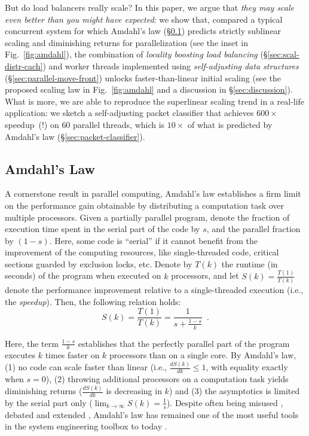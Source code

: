 \documentclass[letterpaper,twocolumn,10pt]{article}
\begin{document}
But do load balancers really scale? In this paper, we argue that \emph{they may scale even better than you might have expected}: we show that, compared a typical concurrent system for which Amdahl's law (\S\ref{sec:amdahl-law}) predicts strictly sublinear scaling and diminishing returns for parallelization (see the inset in Fig.~\ref{fig:amdahl}), the combination of \emph{locality boosting load balancing} (\S\ref{sec:scal-distr-cach}) and worker threads implemented using \emph{self-adjusting data structures}  (\S\ref{sec:parallel-move-front}) unlocks faster-than-linear initial scaling (see the proposed scaling law in Fig.~\ref{fig:amdahl} and a discussion in \S\ref{sec:discussion}). What is more, we are able to reproduce the superlinear scaling trend in a real-life application: we sketch a self-adjusting packet classifier that achieves $600\times$ speedup~(!) on $60$ parallel threads, which is $10\times$ of what is predicted by Amdahl's law (\S\ref{sec:packet-classifier}).

\subsection{Amdahl's Law}
\label{sec:amdahl-law}

A cornerstone result in parallel computing, Amdahl's law \cite{10.1145/1465482.1465560} establishes a firm limit on the performance gain obtainable by distributing a computation task over multiple processors. Given a partially parallel program, denote the fraction of execution time spent %
in the serial part of the code by $s$, and the parallel fraction by $(1-s)$. Here, some code is ``serial'' if it cannot benefit from the improvement of the computing resources, like single-threaded code, critical sections guarded by exclusion locks, etc. Denote by $T(k)$ the runtime (in seconds) of the program when executed on $k$ processors, and let $S(k)=\frac{T(1)}{T(k)}$ denote the  performance improvement relative to a single-threaded execution (i.e., the \emph{speedup}). Then, the following relation holds:
\begin{equation}\label{eq:amdahl}
S(k) = \frac{T(1)}{T(k)} = \frac{1}{s + \frac{1-s}{k}} \enspace .
\end{equation}

Here, the term $\frac{1-s}{k}$ establishes that the perfectly parallel part of the program executes $k$ times faster on $k$ processors than on a single core. By Amdahl's law, (1) no code can scale faster than linear (i.e., $\frac{d S(k)}{d k} \le 1$, with equality exactly when $s=0$), (2) throwing additional processors on a computation task yields diminishing returns ($\frac{d S(k)}{d k}$ is decreasing in $k$) and (3) the asymptotics is limited by the serial part only ($\lim_{k\to \infty}S(k) = \frac1{s}$). Despite often being misused \cite{10.5555/775339.775386}, debated \cite{10.1145/42411.42415} and extended \cite{4563876, 6280307,1580395,406581,6163449}, Amdahl's law has remained one of the most useful tools in the system engineering toolbox to today \cite{10.5555/1951599}. %
\end{document}
